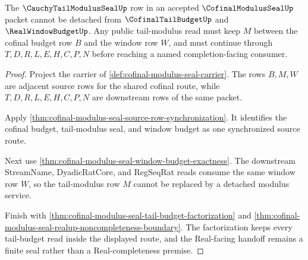 \begin{theorem}
\label{thm:cofinal-modulus-seal-tail-modulus-handoff}
The $\CauchyTailModulusSealUp$ row in an accepted $\CofinalModulusSealUp$ packet cannot be detached from $\CofinalTailBudgetUp$ and $\RealWindowBudgetUp$. Any public tail-modulus read must keep $M$ between the cofinal budget row $B$ and the window row $W$, and must continue through $T,D,R,L,E,H,C,P,N$ before reaching a named completion-facing consumer.
\end{theorem}
\begin{proof}
Project the carrier of \autoref{def:cofinal-modulus-seal-carrier}. The rows $B,M,W$ are adjacent source rows for the shared cofinal route, while $T,D,R,L,E,H,C,P,N$ are downstream rows of the same packet.

Apply \autoref{thm:cofinal-modulus-seal-source-row-synchronization}. It identifies the cofinal budget, tail-modulus seal, and window budget as one synchronized source route.

Next use \autoref{thm:cofinal-modulus-seal-window-budget-exactness}. The downstream StreamName, DyadicRatCore, and RegSeqRat reads consume the same window row $W$, so the tail-modulus row $M$ cannot be replaced by a detached modulus service.

Finish with \autoref{thm:cofinal-modulus-seal-tail-budget-factorization} and \autoref{thm:cofinal-modulus-seal-realup-noncompleteness-boundary}. The factorization keeps every tail-budget read inside the displayed route, and the Real-facing handoff remains a finite seal rather than a Real-completeness premise.
\end{proof}

